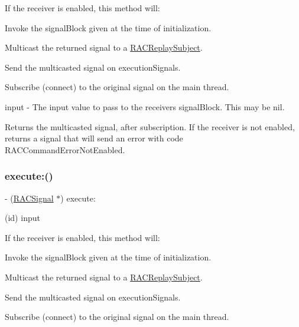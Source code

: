 If the receiver is enabled, this method will\+:


\begin{DoxyEnumerate}
\item Invoke the {\ttfamily signal\+Block} given at the time of initialization.
\item Multicast the returned signal to a \mbox{\hyperlink{interface_r_a_c_replay_subject}{R\+A\+C\+Replay\+Subject}}.
\item Send the multicasted signal on {\ttfamily execution\+Signals}.
\item Subscribe (connect) to the original signal on the main thread.
\end{DoxyEnumerate}

input -\/ The input value to pass to the receiver\textquotesingle{}s {\ttfamily signal\+Block}. This may be nil.

Returns the multicasted signal, after subscription. If the receiver is not enabled, returns a signal that will send an error with code R\+A\+C\+Command\+Error\+Not\+Enabled. \mbox{\label{interface_r_a_c_command_a91d8d0063d512d5989382e89013a0d74}} 
\subsubsection{\texorpdfstring{execute\+:()}{execute:()}\hspace{0.1cm}{\footnotesize\ttfamily [2/3]}}
{\footnotesize\ttfamily -\/ (\mbox{\hyperlink{interface_r_a_c_signal}{R\+A\+C\+Signal}} $\ast$) execute\+: \begin{DoxyParamCaption}\item[{(id)}]{input }\end{DoxyParamCaption}}

If the receiver is enabled, this method will\+:


\begin{DoxyEnumerate}
\item Invoke the {\ttfamily signal\+Block} given at the time of initialization.
\item Multicast the returned signal to a \mbox{\hyperlink{interface_r_a_c_replay_subject}{R\+A\+C\+Replay\+Subject}}.
\item Send the multicasted signal on {\ttfamily execution\+Signals}.
\item Subscribe (connect) to the original signal on the main thread.
\end{DoxyEnumerate}

